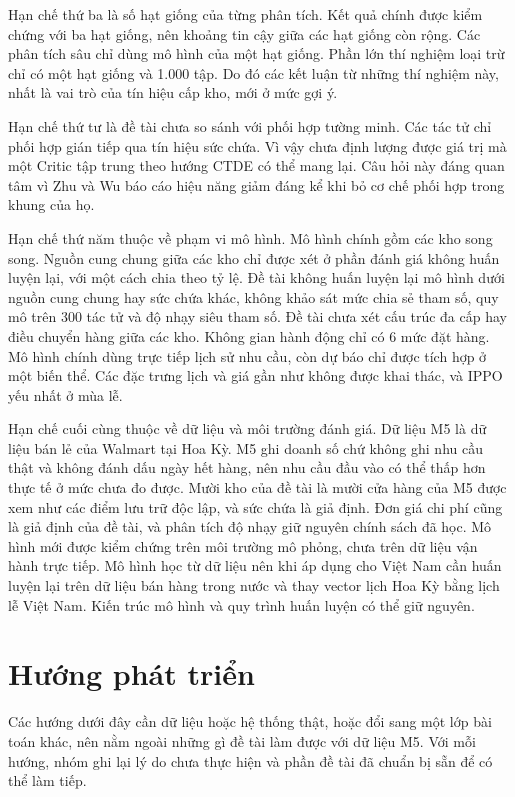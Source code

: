 Hạn chế thứ ba là số hạt giống của từng phân tích. Kết quả chính được kiểm chứng với ba hạt giống, nên khoảng tin cậy giữa các hạt giống còn rộng. Các phân tích sâu chỉ dùng mô hình của một hạt giống. Phần lớn thí nghiệm loại trừ chỉ có một hạt giống và 1.000 tập. Do đó các kết luận từ những thí nghiệm này, nhất là vai trò của tín hiệu cấp kho, mới ở mức gợi ý.

Hạn chế thứ tư là đề tài chưa so sánh với phối hợp tường minh. Các tác tử chỉ phối hợp gián tiếp qua tín hiệu sức chứa. Vì vậy chưa định lượng được giá trị mà một Critic tập trung theo hướng CTDE \parencite{yu2022mappo} có thể mang lại. Câu hỏi này đáng quan tâm vì Zhu và Wu \cite{zhu2026spatiotemporal} báo cáo hiệu năng giảm đáng kể khi bỏ cơ chế phối hợp trong khung của họ.

Hạn chế thứ năm thuộc về phạm vi mô hình. Mô hình chính gồm các kho song song. Nguồn cung chung giữa các kho chỉ được xét ở phần đánh giá không huấn luyện lại, với một cách chia theo tỷ lệ. Đề tài không huấn luyện lại mô hình dưới nguồn cung chung hay sức chứa khác, không khảo sát mức chia sẻ tham số, quy mô trên 300 tác tử và độ nhạy siêu tham số. Đề tài chưa xét cấu trúc đa cấp \parencite{clark1960} hay điều chuyển hàng giữa các kho. Không gian hành động chỉ có 6 mức đặt hàng. Mô hình chính dùng trực tiếp lịch sử nhu cầu, còn dự báo chỉ được tích hợp ở một biến thể. Các đặc trưng lịch và giá gần như không được khai thác, và IPPO yếu nhất ở mùa lễ.

Hạn chế cuối cùng thuộc về dữ liệu và môi trường đánh giá. Dữ liệu M5 là dữ liệu bán lẻ của Walmart tại Hoa Kỳ. M5 ghi doanh số chứ không ghi nhu cầu thật và không đánh dấu ngày hết hàng, nên nhu cầu đầu vào có thể thấp hơn thực tế ở mức chưa đo được. Mười kho của đề tài là mười cửa hàng của M5 được xem như các điểm lưu trữ độc lập, và sức chứa là giả định. Đơn giá chi phí cũng là giả định của đề tài, và phân tích độ nhạy giữ nguyên chính sách đã học. Mô hình mới được kiểm chứng trên môi trường mô phỏng, chưa trên dữ liệu vận hành trực tiếp. Mô hình học từ dữ liệu nên khi áp dụng cho Việt Nam cần huấn luyện lại trên dữ liệu bán hàng trong nước và thay vector lịch Hoa Kỳ bằng lịch lễ Việt Nam. Kiến trúc mô hình và quy trình huấn luyện có thể giữ nguyên.

\section{Hướng phát triển}
\label{sec:huongPhatTrien}

Các hướng dưới đây cần dữ liệu hoặc hệ thống thật, hoặc đổi sang một lớp bài toán khác, nên nằm ngoài những gì đề tài làm được với dữ liệu M5. Với mỗi hướng, nhóm ghi lại lý do chưa thực hiện và phần đề tài đã chuẩn bị sẵn để có thể làm tiếp.

